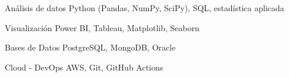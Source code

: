 
\begin{cvskills}

\cvskill
{Análisis de datos}
{Python (Pandas, NumPy, SciPy), SQL, estadística aplicada}

\cvskill
{Visualización}
{Power BI, Tableau, Matplotlib, Seaborn}

\cvskill
{Bases de Datos}
{PostgreSQL, MongoDB, Oracle}

\cvskill
{Cloud - DevOps}
{AWS, Git, GitHub Actions}

\end{cvskills}
